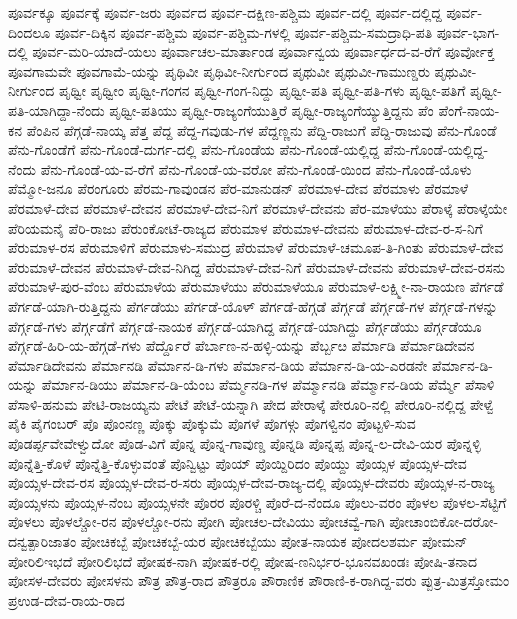 {ಪೂರ್ವಕ್ಕೂ
ಪೂರ್ವಕ್ಕೆ
ಪೂರ್ವ-ಜರು
ಪೂರ್ವದ
ಪೂರ್ವ-ದಕ್ಷಿಣ-ಪಶ್ಚಿಮ
ಪೂರ್ವ-ದಲ್ಲಿ
ಪೂರ್ವ-ದಲ್ಲಿದ್ದ
ಪೂರ್ವ-ದಿಂದಲೂ
ಪೂರ್ವ-ದಿಕ್ಕಿನ
ಪೂರ್ವ-ಪಶ್ಚಿಮ
ಪೂರ್ವ-ಪಶ್ಚಿಮ-ಗಳಲ್ಲಿ
ಪೂರ್ವ-ಪಶ್ಚಿಮ-ಸಮದ್ರಾಧಿ-ಪತಿ
ಪೂರ್ವ-ಭಾಗ-ದಲ್ಲಿ
ಪೂರ್ವ-ಮರಿ-ಯಾದೆ-ಯಲು
ಪೂರ್ವಾಚಲ-ಮಾರ್ತಾಂಡ
ಪೂರ್ವಾನ್ವಯ
ಪೂರ್ವಾರ್ಧದ-ವ-ರೆಗೆ
ಪೂರ್ವೋಕ್ತ
ಪೂವಗಾಮವೇ
ಪೂವಗಾಮೆ-ಯನ್ನು
ಪೃಥಿವೀ
ಪೃಥಿವೀ-ನೀರ್ಗುಂದ
ಪೃಥುವೀ
ಪೃಥುವೀ-ಗಾಮುಣ್ಡರು
ಪೃಥುವೀ-ನೀರ್ಗುಂದ
ಪೃಥ್ವೀ
ಪೃಥ್ವೀಂ
ಪೃಥ್ವೀ-ಗಂಗನ
ಪೃಥ್ವೀ-ಗಂಗ-ನಿದ್ದು
ಪೃಥ್ವೀ-ಪತಿ
ಪೃಥ್ವೀ-ಪತಿ-ಗಳು
ಪೃಥ್ವೀ-ಪತಿಗೆ
ಪೃಥ್ವೀ-ಪತಿ-ಯಾಗಿದ್ದಾ-ನೆಂದು
ಪೃಥ್ವೀ-ಪತಿಯು
ಪೃಥ್ವೀ-ರಾಜ್ಯಂಗೆಯುತ್ತಿರೆ
ಪೃಥ್ವೀ-ರಾಜ್ಯಂಗೆಯ್ಯುತ್ತಿದ್ದನು
ಪೆಂ
ಪೆಂಗೆ-ನಾಯ-ಕನ
ಪೆಂಪಿನ
ಪೆಗ್ಗಡೆ-ನಾಯ್ಕ
ಪೆತ್ತ
ಪೆದ್ದ
ಪೆದ್ದ-ಗವುಡು-ಗಳ
ಪೆದ್ದಣ್ಣನು
ಪೆದ್ದಿ-ರಾಜುಗೆ
ಪೆದ್ದಿ-ರಾಜುವು
ಪೆನು-ಗೊಂಡೆ
ಪೆನು-ಗೊಂಡೆಗೆ
ಪೆನು-ಗೊಂಡೆ-ದುರ್ಗ-ದಲ್ಲಿ
ಪೆನು-ಗೊಂಡೆಯ
ಪೆನು-ಗೊಂಡೆ-ಯಲ್ಲಿದ್ದ
ಪೆನು-ಗೊಂಡೆ-ಯಲ್ಲಿದ್ದ-ನೆಂದು
ಪೆನು-ಗೊಂಡೆ-ಯ-ವ-ರೆಗೆ
ಪೆನು-ಗೊಂಡೆ-ಯ-ವರೋ
ಪೆನು-ಗೊಂಡೆ-ಯಿಂದ
ಪೆನು-ಗೊಂಡೆ-ಯೊಳು
ಪೆಮ್ಮೋ-ಜನೂ
ಪೆರಂಗೂರು
ಪೆರಮ-ಗಾವುಂಡನ
ಪೆರ-ಮಾನುಡನ್
ಪೆರಮಾಳ-ದೇವ
ಪೆರಮಾಳು
ಪೆರಮಾಳೆ
ಪೆರಮಾಳೆ-ದೇವ
ಪೆರಮಾಳೆ-ದೇವನ
ಪೆರಮಾಳೆ-ದೇವ-ನಿಗೆ
ಪೆರಮಾಳೆ-ದೇವನು
ಪೆರ-ಮಾಳೆಯು
ಪೆರಾಳ್ಕೆ
ಪೆರಾಳ್ಕೆಯೇ
ಪೆರಿಯಮನೈ
ಪೆರಿ-ರಾಜು
ಪೆರುಂಕೋಟೆ-ರಾಜ್ಯದ
ಪೆರುಮಾಳ
ಪೆರುಮಾಳ-ದೇವನು
ಪೆರುಮಾಳ-ದೇವ-ರ-ಸ-ನಿಗೆ
ಪೆರುಮಾಳ-ರಸ
ಪೆರುಮಾಳಿಗೆ
ಪೆರುಮಾಳು-ಸಮುದ್ರ
ಪೆರುಮಾಳೆ
ಪೆರುಮಾಳೆ-ಚಮೂಪ-ತಿ-ಗಿಂತು
ಪೆರುಮಾಳೆ-ದೇವ
ಪೆರುಮಾಳೆ-ದೇವನ
ಪೆರುಮಾಳೆ-ದೇವ-ನಿಗಿದ್ದ
ಪೆರುಮಾಳೆ-ದೇವ-ನಿಗೆ
ಪೆರುಮಾಳೆ-ದೇವನು
ಪೆರುಮಾಳೆ-ದೇವ-ರಸನು
ಪೆರುಮಾಳೆ-ಪುರ-ವೆಂಬ
ಪೆರುಮಾಳೆಯ
ಪೆರುಮಾಳೆಯು
ಪೆರುಮಾಳೆಯೂ
ಪೆರುಮಾಳೆ-ಲಕ್ಷ್ಮೀ-ನಾ-ರಾಯಣ
ಪೆರ್ಗಡೆ
ಪೆರ್ಗಡೆ-ಯಾಗಿ-ರುತ್ತಿದ್ದನು
ಪೆರ್ಗಡೆಯು
ಪೆರ್ಗಡೆ-ಯೊಳ್
ಪೆರ್ಗಡೆ-ಹೆಗ್ಗಡೆ
ಪೆರ್ಗ್ಗಡೆ
ಪೆರ್ಗ್ಗಡೆ-ಗಳ
ಪೆರ್ಗ್ಗಡೆ-ಗಳನ್ನು
ಪೆರ್ಗ್ಗಡೆ-ಗಳು
ಪೆರ್ಗ್ಗಡೆಗೆ
ಪೆರ್ಗ್ಗಡೆ-ನಾಯಕ
ಪೆರ್ಗ್ಗಡೆ-ಯಾಗಿದ್ದ
ಪೆರ್ಗ್ಗಡೆ-ಯಾಗಿದ್ದು
ಪೆರ್ಗ್ಗಡೆಯು
ಪೆರ್ಗ್ಗಡೆಯೂ
ಪೆರ್ಗ್ಗಡೆ-ಹಿರಿ-ಯ-ಹೆಗ್ಗಡೆ-ಗಳು
ಪೆರ್ದ್ದೊರೆ
ಪೆರ್ಬಾಣ-ನ-ಹಳ್ಳಿ-ಯನ್ನು
ಪೆರ್ಬ್ಬೞ
ಪೆರ್ಮಾಡಿ
ಪೆರ್ಮಾಡಿದೇವನ
ಪೆರ್ಮಾಡಿದೇವನು
ಪೆರ್ಮಾನಡಿ
ಪೆರ್ಮಾನ-ಡಿ-ಗಳು
ಪೆರ್ಮಾನ-ಡಿಯ
ಪೆರ್ಮಾನ-ಡಿ-ಯ-ಎರಡನೇ
ಪೆರ್ಮಾನ-ಡಿ-ಯನ್ನು
ಪೆರ್ಮಾನ-ಡಿಯು
ಪೆರ್ಮಾನ-ಡಿ-ಯೆಂಬ
ಪೆರ್ಮ್ಮನಡಿ-ಗಳ
ಪೆರ್ಮ್ಮಾನಡಿ
ಪೆರ್ಮ್ಮಾನ-ಡಿಯ
ಪೆರ್ಮ್ಮೆ
ಪೆಸಾಳಿ
ಪೆಸಾಳಿ-ಹನುಮ
ಪೇಟಿ-ರಾಜಯ್ಯನು
ಪೇಟೆ
ಪೇಟೆ-ಯನ್ನಾಗಿ
ಪೇದ
ಪೇರಾಳ್ಕೆ
ಪೇರೂರಿ-ನಲ್ಲಿ
ಪೇರೂರಿ-ನಲ್ಲಿದ್ದ
ಪೇಳ್ವೆ
ಪೈಕಿ
ಪೈಗಂಬರ್
ಪೊ
ಪೊಂನಣ್ಣ
ಪೊಕ್ಕು
ಪೊಕ್ಕುಮೆ
ಪೊಗಳೆ
ಪೊಗಳ್ಗು
ಪೊಗಳ್ವಿನಂ
ಪೊಟ್ಟಳಿ-ಸುವ
ಪೊಡರ್ಪ್ಪವೇವೇಳ್ವುದೋ
ಪೊಡ-ವಿಗೆ
ಪೊನ್ನ
ಪೊನ್ನ-ಗಾವುಣ್ಡ
ಪೊನ್ನಡಿ
ಪೊನ್ನಪ್ಪ
ಪೊನ್ನ-ಲ-ದೇವಿ-ಯರ
ಪೊನ್ನಳ್ಳಿ
ಪೊನ್ನೆತ್ತಿ-ಕೊಳೆ
ಪೊನ್ನೆತ್ತಿ-ಕೊಳ್ಳುವಂತೆ
ಪೊನ್ವಿಟ್ಟು
ಪೊಯ್
ಪೊಯ್ದಿರಿದಂ
ಪೊಯ್ದು
ಪೊಯ್ಸಳ
ಪೊಯ್ಸಳ-ದೇವ
ಪೊಯ್ಸಳ-ದೇವ-ರಸ
ಪೊಯ್ಸಳ-ದೇವ-ರ-ಸರು
ಪೊಯ್ಸಳ-ದೇವ-ರಾಜ್ಯ-ದಲ್ಲಿ
ಪೊಯ್ಸಳ-ದೇವರು
ಪೊಯ್ಸಳ-ನ-ರಾಜ್ಯ
ಪೊಯ್ಸಳನು
ಪೊಯ್ಸಳ-ನೆಂಬ
ಪೊಯ್ಸಳನೇ
ಪೊರರ
ಪೊರಳ್ಚಿ
ಪೊರೆ-ದ-ನೆಂದೂ
ಪೊಲು-ವರಂ
ಪೊಳಲ
ಪೊಳಲ-ಸೆಟ್ಟಿಗೆ
ಪೊಳಲು
ಪೊಳಲ್ಚೋ-ರನ
ಪೊಳಲ್ಚೋ-ರನು
ಪೋಗಿ
ಪೋಚಲ-ದೇವಿಯು
ಪೋಚವ್ವೆ-ಗಾಗಿ
ಪೋಚಾಂಬಿಕೋ-ದರೋ-ದನ್ವತ್ಪಾರಿಜಾತಂ
ಪೋಚಿಕಬ್ಬೆ
ಪೋಚಿಕಬ್ಬೆ-ಯರ
ಪೋಚಿಕಬ್ಬೆಯು
ಪೋತ-ನಾಯಕ
ಪೋದಲಶರ್ಮ
ಪೋಮನ್
ಪೋರಿಲಿಇಭದೆ
ಪೋರಿಲಿಭದೆ
ಪೋಷಕ-ನಾಗಿ
ಪೋಷಕ-ರಲ್ಲಿ
ಪೋಷ-ಣನಿರ್ಭರ-ಭೂನವಖಂಡಃ
ಪೋಷಿ-ತನಾದ
ಪೋಸಳ-ದೇವರು
ಪೋಸಳನು
ಪೌತ್ರ
ಪೌತ್ರ-ರಾದ
ಪೌತ್ರರೂ
ಪೌರಾಣಿಕ
ಪೌರಾಣಿ-ಕ-ರಾಗಿದ್ದ-ವರು
ಪ್ಪುತ್ರ-ಮಿತ್ರಸ್ತೋಮಂ
ಪ್ರಉಡ-ದೇವ-ರಾಯ-ರಾದ
}

